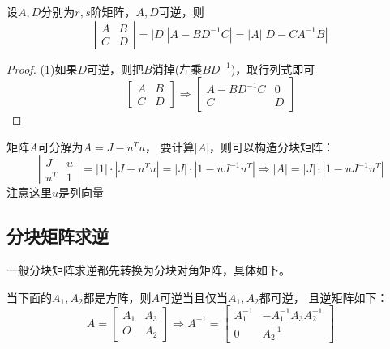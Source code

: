 \begin{theorem}[一般分块矩阵的行列式]
  设$A,D$分别为$r,s$阶矩阵，$A,D$可逆，则
  \begin{equation*}
    \left|
      \begin{array}{cc}
        A&B \\
         C&D
      \end{array}
    \right| = |D| |A - BD^{-1}C| = |A| |D - CA^{-1}B|
  \end{equation*}
\end{theorem}

\begin{proof}
  (1)如果$D$可逆，则把$B$消掉(左乘$BD^{-1}$)，取行列式即可
  \begin{equation*}
    \left[
      \begin{array}{cc}
        A&B\\
        C&D
      \end{array}
    \right] \Rightarrow \left[
      \begin{array}{cc}
        A - BD^{-1}C&0\\
        C&D
      \end{array}
    \right]
  \end{equation*}
\end{proof}

\begin{theorem}
  矩阵$A$可分解为$A = J - u^Tu$，
  要计算$|A|$，则可以构造分块矩阵：
  \begin{equation*}
    \left|
      \begin{array}{cc}
        J&u\\
        u^T&1
      \end{array}
    \right| = |1|\cdot |J - u^Tu| = |J|\cdot |1 - uJ^{-1}u^T| \Rightarrow |A| = |J| \cdot |1 - uJ^{-1}u^T|
  \end{equation*}
  注意这里$u$是列向量
\end{theorem}






\subsection{分块矩阵求逆}

一般分块矩阵求逆都先转换为分块对角矩阵，具体如下。

\begin{theorem}[上三角分块矩阵求逆]
  当下面的$A_1,A_2$都是方阵，则$A$可逆当且仅当$A_1,A_2$都可逆，
  且逆矩阵如下：
  \begin{equation*}
    A = \left[
      \begin{array}{cc}
        A_1&A_3\\
        O&A_2
      \end{array}
    \right] \Rightarrow A^{-1} = \left[
      \begin{array}{cc}
        A_1^{-1}&-A_1^{-1}A_3A_2^{-1} \\
        0&A_2^{-1}
      \end{array}
    \right]
  \end{equation*}
\end{theorem}

